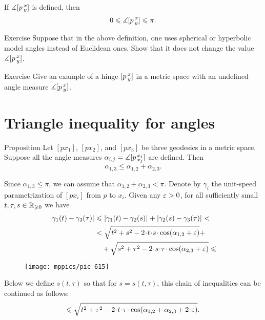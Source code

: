 If $\measuredangle[p\,{}^{x}_{y}]$ is defined, then
\[0\leqslant \measuredangle[p\,{}^{x}_{y}]\leqslant \pi.\]

\begin{thm}{Exercise}\label{ex:angkK}
Suppose that in the above definition, one uses spherical or hyperbolic model angles instead of Euclidean ones.
Show that it does not change the value $\measuredangle[p\,{}^{x}_{y}]$.
\end{thm}


\begin{thm}{Exercise}\label{ex:undefined-angle}
Give an example of a hinge $[p\,{}^{x}_{y}]$ in a metric space with an undefined angle measure $\measuredangle[p\,{}^{x}_{y}]$.
\end{thm}

\section{Triangle inequality for angles}

\begin{thm}{Proposition}\label{claim:angle-3angle-inq}
Let  $[px_1]$, $[px_2]$, and $[px_3]$ be three geodesics in a metric space.
Suppose all the angle measures $\alpha_{i, j}=\measuredangle[p\,{}^{x_i}_{x_j}]$ are defined.
Then 
\[\alpha_{1,3}\le \alpha_{1,2}+\alpha_{2,3}.\]

\end{thm}



Since $\alpha_{1,3}\le\pi$, we can assume that $\alpha_{1,2}+\alpha_{2,3}< \pi$.
Denote by $\gamma_i$ the unit-speed parametrization of $[px_i]$ from $p$ to $x_i$.
Given any $\varepsilon>0$, for all sufficiently small $t,\tau,s\in\mathbb{R}_{\geqslant0}$ we have
\begin{align*}
\dist{\gamma_1(t)}{\gamma_3(\tau)}{}
&\le 
\dist{\gamma_1(t)}{\gamma_2(s)}{}+\dist{\gamma_2(s)}{\gamma_3(\tau)}{}<\\
&<
\sqrt{t^2+s^2-2\cdot t\cdot  s\cdot \cos(\alpha_{1,2}+\eps)} +
\\
&\quad+\sqrt{s^2+\tau^2-2\cdot s\cdot \tau\cdot \cos(\alpha_{2,3}+\eps)}\le
\end{align*}

\begin{wrapfigure}{o}{30 mm}
\vskip-16mm
\centering
\texttt{[image: mppics/pic-615]}
\vskip0mm
\end{wrapfigure}

Below we define 
$s(t,\tau)$ so that for 
$s=s(t,\tau)$, this chain of inequalities can be continued as follows:
\[\le
\sqrt{t^2+\tau^2-2\cdot t\cdot \tau\cdot \cos(\alpha_{1,2}+\alpha_{2,3}+2\cdot \eps)}.
\]

